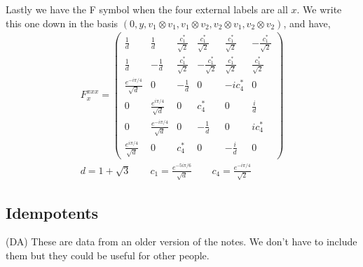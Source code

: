 \documentclass[12pt,a4paper]{article}
\newcommand{\tp}{\otimes}
\newcommand{\dave}[1]{{\color{ao(english)}\footnotesize{(DA) #1}}}
\begin{document}
Lastly we have the F symbol when the four external labels are all $x$.
We write this one down in the basis $(0,y, v_1\tp v_1,v_1 \tp v_2, v_2 \tp v_1, v_2 \tp v_2)$, and have,
\begin{align}
F^{xxx}_x  = 
 \left(\begin{matrix}
\frac{1}{d} & \frac{1}{d} & \frac{c_1^*}{\sqrt{2}} & \frac{c_1^*}{\sqrt{2}} & \frac{c_1^*}{\sqrt{2}} & - \frac{c_1^*}{\sqrt{2}} \\
\frac{1}{d} & - \frac{1}{d} & \frac{c_1^*}{\sqrt{2}} & -\frac{c_1^*}{\sqrt{2}} & \frac{c_1^*}{\sqrt{2}} & \frac{c_1^*}{\sqrt{2}} \\
\frac{e^{- i \pi/4}}{\sqrt{d}} & 0 & -\frac{1}{d} & 0 & -i c_4^* & 0 \\
0 & \frac{e^{i \pi /4}}{\sqrt{d}} & 0 &c_4^* & 0 & \frac{ i}{d} \\
0 & \frac{e^{- i \pi /4}}{\sqrt{d}} & 0 & -\frac{1}{d} & 0 & i c_4^* \\ 
\frac{e^{i \pi /4}}{\sqrt{d}} & 0 & c_4^* & 0 & - \frac{i}{d} & 0
\end{matrix} \right) \\
d = 1 + \sqrt{3} \quad \quad c_1 = \frac{e^{-5 i \pi/6} }{\sqrt{d}} \quad \quad c_4 = \frac{e^{-i \pi/4}}{\sqrt{2}}
\end{align}

\newpage
\subsection{Idempotents}
\label{IdempotentsHalfESix}
\dave{These are data from an older version of the notes. We don't have to include them but they could be useful for other people. }
\end{document}
